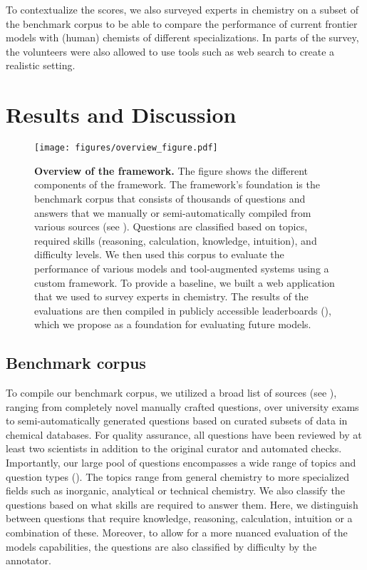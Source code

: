 \documentclass[11pt, oneside]{article}
\begin{document}
\begin{refsection}
To contextualize the scores, we also surveyed  experts in chemistry on a subset of the benchmark corpus to be able to compare the performance of current frontier models with (human) chemists of different specializations. In parts of the survey, the volunteers were also allowed to use tools such as web search to create a realistic setting.

\section{Results and Discussion}

\begin{figure}
    \texttt{[image: figures/overview\_figure.pdf]}
    \caption{\textbf{Overview of the \chembench framework.} The figure shows the different components of the \chembench framework.
    The framework's foundation is the benchmark corpus that consists of thousands of questions and answers that we manually or semi-automatically compiled from various sources (see ).
    Questions are classified based on topics, required skills (reasoning, calculation, knowledge, intuition), and difficulty levels.
    We then used this corpus to evaluate the performance of various models and tool-augmented systems using a custom framework. To provide a baseline, we built a web application that we used to survey experts in chemistry.
    The results of the evaluations are then compiled in publicly accessible leaderboards (), which we propose as a foundation for evaluating future models.
    }
    \label{fig:overview_figure}
\end{figure}

\subsection{Benchmark corpus}

To compile our benchmark corpus, we utilized a broad list of sources (see ), ranging from completely novel manually crafted questions, over university exams to semi-automatically generated questions based on curated subsets of data in chemical databases.
For quality assurance, all questions have been reviewed by at least two scientists in addition to the original curator and automated checks.
Importantly, our large pool of questions encompasses a wide range of topics and question types (). The topics range from general chemistry to more specialized fields such as inorganic, analytical or technical chemistry.
We also classify the questions based on what skills are required to answer them. Here, we distinguish between questions that require knowledge, reasoning, calculation, intuition or a combination of these.
Moreover, to allow for a more nuanced evaluation of the models capabilities, the questions are also classified by difficulty by the annotator.


\end{refsection}
\end{document}
